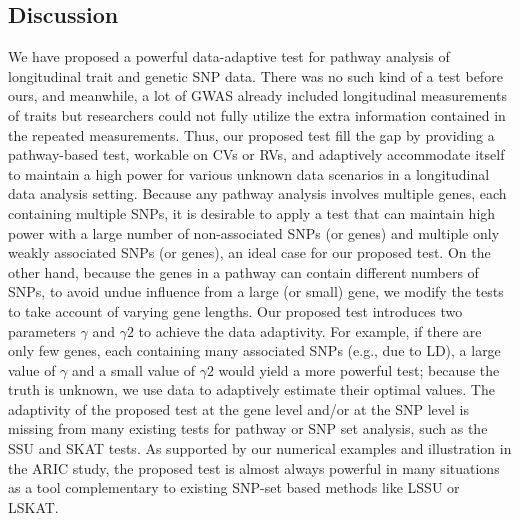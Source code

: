 \documentclass[12pt]{article}
\begin{document}
\subsection{Discussion}
We have proposed a powerful data-adaptive test for pathway analysis of longitudinal trait and genetic SNP data. There was no such kind of a test before ours, and meanwhile, a lot of GWAS  \cite{Aulchenko2009,Ionita-Laza2007,Kamatani2010,Kathiresan2007,Sabatti2008} already included longitudinal measurements of traits but researchers could not fully utilize the extra information contained in the repeated measurements. Thus, our proposed test fill the gap by providing a pathway-based test, workable on CVs or RVs, and adaptively accommodate itself to maintain a high power for various unknown data scenarios in a longitudinal data analysis setting. Because any pathway analysis involves multiple genes, each containing multiple SNPs, it is desirable to apply a test that can maintain high power with a large number of non-associated SNPs (or genes) and multiple only weakly associated SNPs (or genes), an ideal case for our proposed test. On the other hand, because the genes in a pathway can contain different numbers of SNPs, to avoid undue influence from a large (or small) gene, we modify the tests to take account of varying gene lengths. Our proposed test introduces two parameters $\gamma$ and $\gamma2$ to achieve the data adaptivity. For example, if there are only few genes, each containing many associated SNPs (e.g., due to LD), a large value of $\gamma$ and a small value of $\gamma2$ would yield a more powerful test; because the truth is unknown, we use data to adaptively estimate their optimal values. The adaptivity of the proposed test at the gene level and/or at the SNP level is missing from many existing tests for pathway or SNP set analysis, such as the SSU and SKAT tests. As supported by our numerical examples and illustration in the ARIC study, the proposed test is almost always powerful in many situations as a tool complementary to existing SNP-set based methods like LSSU or LSKAT. 
\end{document}
